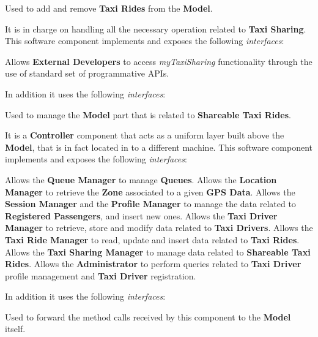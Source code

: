 \begin{itemize}
\begin{itemize}
\begin{itemize}
			 Used to add and remove \textbf{Taxi Rides} from the \textbf{Model}.
		\end{itemize} 
		 It is in charge on handling all the necessary operation related to \textbf{Taxi Sharing}.
		This software component implements and exposes the following \textit{interfaces}:
		\begin{itemize}
			 Allows \textbf{External Developers} to access \textit{myTaxiSharing} functionality through the use of standard set of programmative APIs.
		\end{itemize}
		In addition it uses the following \textit{interfaces}:
		\begin{itemize}
			 Used to manage the \textbf{Model} part that is related to \textbf{Shareable Taxi Rides}.
		\end{itemize}
		 It is a \textbf{Controller} component that acts as a uniform layer built above the \textbf{Model}, that is in fact located in to a different machine.
		This software component implements and exposes the following \textit{interfaces}:
		\begin{itemize}
			 Allows the \textbf{Queue Manager} to manage \textbf{Queues}.
			 Allows the \textbf{Location Manager} to retrieve the \textbf{Zone} associated to a given \textbf{GPS Data}.
			 Allows the \textbf{Session Manager} and the \textbf{Profile Manager} to manage the data related to \textbf{Registered Passengers}, and insert new ones.
			 Allows the \textbf{Taxi Driver Manager} to retrieve, store and modify data related to \textbf{Taxi Drivers}.
			 Allows the \textbf{Taxi Ride Manager} to read, update and insert data related to \textbf{Taxi Rides}.
			 Allows the \textbf{Taxi Sharing Manager} to manage data related to \textbf{Shareable Taxi Rides}.
			 Allows the \textbf{Administrator} to perform queries related to \textbf{Taxi Driver} profile management and \textbf{Taxi Driver} registration.
		\end{itemize}
		In addition it uses the following \textit{interfaces}:
		\begin{itemize}
			 Used to forward the method calls received by this component to the \textbf{Model} itself.
		\end{itemize}

\end{itemize}
\end{itemize}
